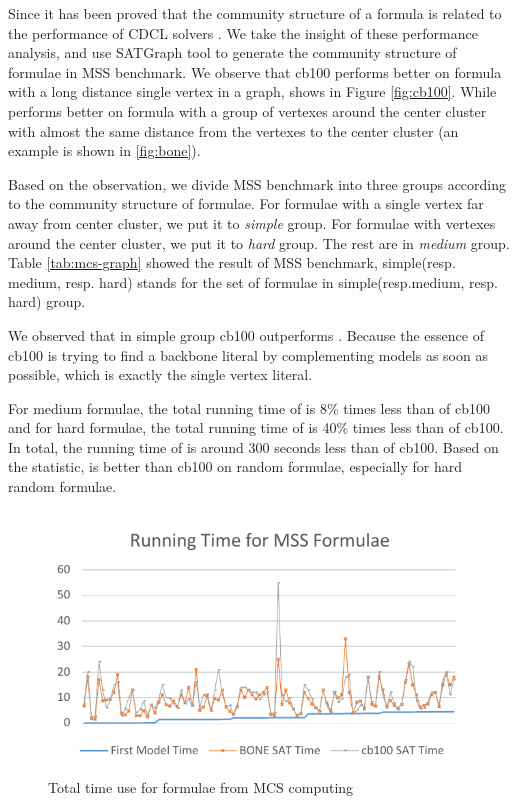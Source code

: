 Since it has been proved that the community structure of a formula is related to the performance of CDCL solvers \cite{NZG2014}. 
We take the insight of these performance analysis, and use SATGraph \cite{NZW2015} tool to generate the community structure of formulae in MSS benchmark. We observe that cb100 performs better on formula with a long distance single vertex in a graph, shows in Figure \ref{fig:cb100}. While \tool performs better on formula with a group of vertexes around the center cluster with almost the same distance from the vertexes to the center cluster (an example is shown in \ref{fig:bone}).

Based on the observation, we divide MSS benchmark into three groups according to the community structure of formulae. For formulae with a single vertex far away from center cluster, we put it to \emph{simple} group. For formulae with vertexes around the center cluster, we put it to \emph{hard} group. The rest are in \emph{medium} group. Table \ref{tab:mcs-graph} showed the result of MSS benchmark, simple(resp. medium, resp. hard) stands for the set of formulae in simple(resp.medium, resp. hard) group.
 
We observed that in simple group cb100 outperforms \tool. Because the essence of cb100 is trying to find a backbone literal by complementing models as soon as possible, which is exactly the single vertex literal.

For medium formulae, the total running time of \tool is 8\% times less than of cb100 and for hard formulae, the total running time of \tool is 40\% times less than of cb100. In total, the running time of \tool is around 300 seconds less than of cb100. Based on the statistic, \tool is better than cb100 on random formulae, especially for hard random formulae.

\begin{figure}
    \centering
    \includegraphics[scale=0.7]{mcs.pdf}
   \caption{Total time use for formulae from MCS computing}
   \label{fig:mcs-time}
\end{figure}

